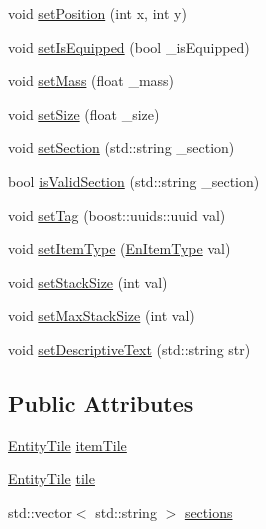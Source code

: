 \begin{DoxyCompactItemize}
\item 
void \mbox{\hyperlink{class_item_af8f03acf491fb71ec8cf1e4248bb4b3d}{set\+Position}} (int x, int y)
\item 
void \mbox{\hyperlink{class_item_ade0d63a4f02aa1a97f977b13f96eb891}{set\+Is\+Equipped}} (bool \+\_\+is\+Equipped)
\item 
void \mbox{\hyperlink{class_item_a3d6c15b2f0a37709541086df917aa761}{set\+Mass}} (float \+\_\+mass)
\item 
void \mbox{\hyperlink{class_item_a5ec923033eeb77f331c8307ef5141fc4}{set\+Size}} (float \+\_\+size)
\item 
void \mbox{\hyperlink{class_item_a87100c3d13e81e42e58969f817d591ef}{set\+Section}} (std\+::string \+\_\+section)
\item 
bool \mbox{\hyperlink{class_item_a10dd503844c230e3d3bf890e969af867}{is\+Valid\+Section}} (std\+::string \+\_\+section)
\item 
void \mbox{\hyperlink{class_item_a18f7cd6d575a855529a4df7b47b3585e}{set\+Tag}} (boost\+::uuids\+::uuid val)
\item 
void \mbox{\hyperlink{class_item_ae4c09d3c7d22b96a4bca5f530f5f3b42}{set\+Item\+Type}} (\mbox{\hyperlink{_equipment_8hpp_a3c7fe24829a0b210a1a4d36e29ac01c6}{En\+Item\+Type}} val)
\item 
void \mbox{\hyperlink{class_item_a0e0495bbb3eafeef69f8f8aa5bf94dbb}{set\+Stack\+Size}} (int val)
\item 
void \mbox{\hyperlink{class_item_a3ae38e2b09f1b12e2fd799865fe7000d}{set\+Max\+Stack\+Size}} (int val)
\item 
void \mbox{\hyperlink{class_item_a5eece4e311535630dec1ac8c65b683e6}{set\+Descriptive\+Text}} (std\+::string str)
\end{DoxyCompactItemize}
\subsection*{Public Attributes}
\begin{DoxyCompactItemize}
\item 
\mbox{\hyperlink{class_entity_tile}{Entity\+Tile}} \mbox{\hyperlink{class_item_a9ba716084bdafdbd767aade37259b56b}{item\+Tile}}
\item 
\mbox{\hyperlink{class_entity_tile}{Entity\+Tile}} \mbox{\hyperlink{class_item_a1784c30db978d4858e34cf812ff261d5}{tile}}
\item 
std\+::vector$<$ std\+::string $>$ \mbox{\hyperlink{class_item_ad0dfdfafbff3d22f196c19db4ce1eb40}{sections}}
\end{DoxyCompactItemize}
